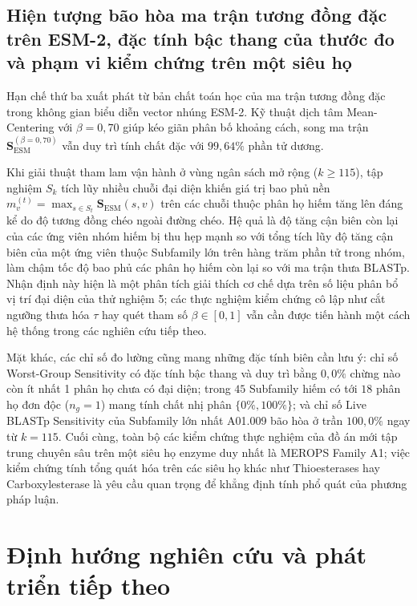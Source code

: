 \subsection{Hiện tượng bão hòa ma trận tương đồng đặc trên ESM-2, đặc tính bậc thang của thước đo và phạm vi kiểm chứng trên một siêu họ}
\label{subsec:lim_dense_matrix_saturation}

Hạn chế thứ ba xuất phát từ bản chất toán học của ma trận tương đồng đặc trong không gian biểu diễn vector nhúng ESM-2. Kỹ thuật dịch tâm Mean-Centering với $\beta = 0{,}70$ giúp kéo giãn phân bố khoảng cách, song ma trận $\mathbf{S}_{\text{ESM}}^{(\beta=0{,}70)}$ vẫn duy trì tính chất đặc với $99{,}64\%$ phần tử dương.

Khi giải thuật tham lam vận hành ở vùng ngân sách mở rộng ($k \ge 115$), tập nghiệm $S_k$ tích lũy nhiều chuỗi đại diện khiến giá trị bao phủ nền $m_v^{(t)} = \max_{s \in S_t} \mathbf{S}_{\text{ESM}}(s, v)$ trên các chuỗi thuộc phân họ hiếm tăng lên đáng kể do độ tương đồng chéo ngoài đường chéo. Hệ quả là độ tăng cận biên còn lại của các ứng viên nhóm hiếm bị thu hẹp mạnh so với tổng tích lũy độ tăng cận biên của một ứng viên thuộc Subfamily lớn trên hàng trăm phần tử trong nhóm, làm chậm tốc độ bao phủ các phân họ hiếm còn lại so với ma trận thưa BLASTp. Nhận định này hiện là một phân tích giải thích cơ chế dựa trên số liệu phân bổ vị trí đại diện của thử nghiệm 5; các thực nghiệm kiểm chứng cô lập như cắt ngưỡng thưa hóa $\tau$ hay quét tham số $\beta \in [0, 1]$ vẫn cần được tiến hành một cách hệ thống trong các nghiên cứu tiếp theo.

Mặt khác, các chỉ số đo lường cũng mang những đặc tính biên cần lưu ý: chỉ số Worst-Group Sensitivity có đặc tính bậc thang và duy trì bằng $0{,}0\%$ chừng nào còn ít nhất 1 phân họ chưa có đại diện; trong $45$ Subfamily hiếm có tới $18$ phân họ đơn độc ($n_g = 1$) mang tính chất nhị phân $\{0\%, 100\%\}$; và chỉ số Live BLASTp Sensitivity của Subfamily lớn nhất A01.009 bão hòa ở trần $100{,}0\%$ ngay từ $k = 115$. Cuối cùng, toàn bộ các kiểm chứng thực nghiệm của đồ án mới tập trung chuyên sâu trên một siêu họ enzyme duy nhất là MEROPS Family A1; việc kiểm chứng tính tổng quát hóa trên các siêu họ khác như Thioesterases hay Carboxylesterase là yêu cầu quan trọng để khẳng định tính phổ quát của phương pháp luận.

\section{Định hướng nghiên cứu và phát triển tiếp theo}
\label{sec:conc_future_work}

